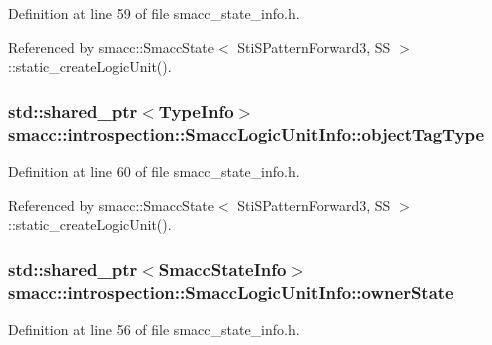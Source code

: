 Definition at line 59 of file smacc\+\_\+state\+\_\+info.\+h.



Referenced by smacc\+::\+Smacc\+State$<$ Sti\+S\+Pattern\+Forward3, S\+S $>$\+::static\+\_\+create\+Logic\+Unit().

\subsubsection[{\texorpdfstring{object\+Tag\+Type}{objectTagType}}]{\setlength{\rightskip}{0pt plus 5cm}std\+::shared\+\_\+ptr$<${\bf Type\+Info}$>$ smacc\+::introspection\+::\+Smacc\+Logic\+Unit\+Info\+::object\+Tag\+Type}\hypertarget{structsmacc_1_1introspection_1_1SmaccLogicUnitInfo_a4a1fc60624c6ad423c28a0bece4805ea}{}\label{structsmacc_1_1introspection_1_1SmaccLogicUnitInfo_a4a1fc60624c6ad423c28a0bece4805ea}


Definition at line 60 of file smacc\+\_\+state\+\_\+info.\+h.



Referenced by smacc\+::\+Smacc\+State$<$ Sti\+S\+Pattern\+Forward3, S\+S $>$\+::static\+\_\+create\+Logic\+Unit().

\subsubsection[{\texorpdfstring{owner\+State}{ownerState}}]{\setlength{\rightskip}{0pt plus 5cm}std\+::shared\+\_\+ptr$<${\bf Smacc\+State\+Info}$>$ smacc\+::introspection\+::\+Smacc\+Logic\+Unit\+Info\+::owner\+State}\hypertarget{structsmacc_1_1introspection_1_1SmaccLogicUnitInfo_a9b6a74ef053eb083efc64febe1bb9db2}{}\label{structsmacc_1_1introspection_1_1SmaccLogicUnitInfo_a9b6a74ef053eb083efc64febe1bb9db2}


Definition at line 56 of file smacc\+\_\+state\+\_\+info.\+h.

